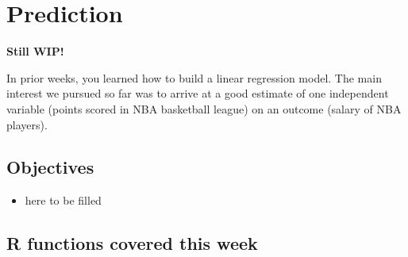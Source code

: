 \documentclass[
]{book}
\providecommand{\tightlist}{%
  \setlength{\itemsep}{0pt}\setlength{\parskip}{0pt}}
\begin{document}
\hypertarget{pm-t}{%
\chapter{Prediction}\label{pm-t}}

\textbf{Still WIP!}

In prior weeks, you learned how to build a linear regression model. The main interest
we pursued so far was to arrive at a good estimate of one independent variable (points scored in NBA basketball league) on an outcome (salary of NBA players).

\hypertarget{objectives-7}{%
\section{Objectives}\label{objectives-7}}

\begin{itemize}
\tightlist
\item
  here to be filled
\end{itemize}

\hypertarget{r-functions-covered-this-week-3}{%
\section{R functions covered this week}\label{r-functions-covered-this-week-3}}
\end{document}
